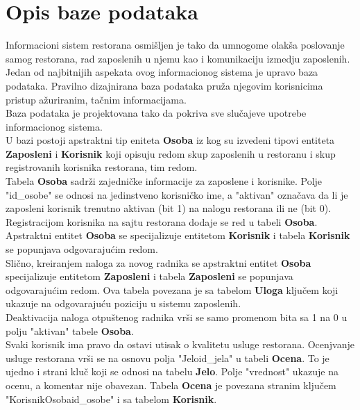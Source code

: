 
\section{Opis baze podataka}
Informacioni sistem  restorana osmišljen je tako da umnogome olakša poslovanje samog restorana, rad zaposlenih u njemu kao i komunikaciju izmedju zaposlenih. Jedan od najbitnijih aspekata ovog informacionog si\-stema je upravo baza podataka. Pravilno dizajnirana baza podataka pruža njegovim korisnicima pristup ažuriranim, tačnim informacijama. \\
\indent Baza podataka je projektovana tako da pokriva sve slučajeve upotrebe informacionog sistema. \\
\indent U bazi postoji apstraktni tip eniteta \textbf{Osoba} iz kog su izvedeni tipovi entiteta  \textbf{Zaposleni} i \textbf{Korisnik} koji opisuju redom skup zaposlenih u restoranu i skup registrovanih korisnika restorana, tim redom. \\

Tabela \textbf{Osoba} sadrži zajedničke informacije za zaposlene i korisnike. Polje "id\_osobe" se odnosi na jedinstveno korisničko ime, a "aktivan" označava da li je zaposleni korisnik trenutno aktivan (bit 1) na nalogu restorana ili ne (bit 0). \\

\indent Registracijom korisnika na sajtu restorana dodaje se red u tabeli \textbf{Oso\-ba}. Apstraktni entitet \textbf{Osoba} se specijalizuje entitetom \textbf{Korisnik} i tabela \textbf{Korisnik} se popunjava odgovarajućim redom. \\

Slično, kreiranjem naloga za novog radnika se apstraktni entitet \textbf{Osoba} specijalizuje entitetom \textbf{Zaposleni} i tabela \textbf{Zaposleni} se popunjava odgovarajućim redom. Ova tabela povezana je sa tabelom \textbf{Uloga} ključem koji ukazuje na odgovarajuću poziciju u sistemu zaposlenih.\\

Deaktivacija naloga otpuštenog radnika vrši se samo promenom bita sa 1 na 0 u polju "aktivan" tabele \textbf{Osoba}.\\

Svaki korisnik ima pravo da ostavi utisak o kvalitetu usluge restorana. Ocenjvanje usluge restorana vrši se na osnovu polja "Jeloid\_jela" u tabeli \textbf{Ocena}. To je ujedno i strani kluč koji se odnosi na tabelu \textbf{Jelo}. Polje "vrednost" ukazuje na ocenu, a komentar nije obavezan. Tabela \textbf{Ocena} je povezana stranim ključem "KorisnikOsobaid\_osobe" i sa tabelom \textbf{Korisnik}. \\

